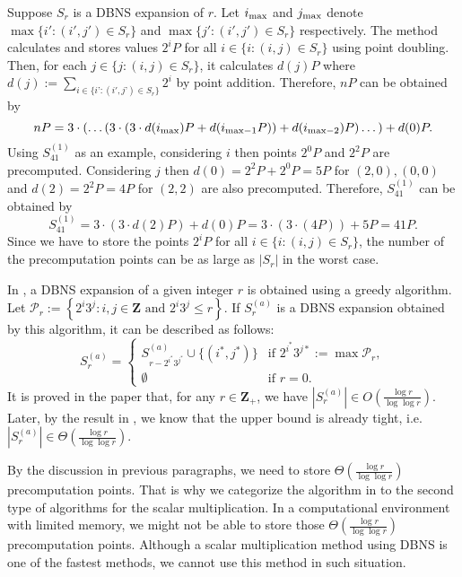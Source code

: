 Suppose $S_r$ is a DBNS expansion of $r$. Let $i_{\rm max}$ and $j_{\rm max}$ denote $\max\{ i' : (i',j') \in S_r \}$ and $\max\{ j' : (i',j') \in S_r \}$ respectively.
The method \cite{MH09} calculates and stores values $2^iP$ for all $i \in \{i : (i, j) \in S_r \}$ using point doubling.
Then, for each $j \in \{j : (i, j) \in S_r \}$, it calculates $d(j)P$ where $d(j) := \sum\limits_{i \in \{i’ : (i',j’) \in S_r\}} 2^i $ by point addition.
Therefore, $nP$ can be obtained by
$$nP = 3\cdot \left( \dots \left( 3 \cdot \left( 3 \cdot d(i_{\rm max})P + d(i_{\mathrm{max} - 1}P) \right) + d(i_{\mathrm{max} - 2})P \right) \dots \right) + d(0)P.$$
Using $S_{41}^{(1)}$ as an example, considering $i$ then points $2^0P$ and $2^2P$ are precomputed.
Considering $j$ then $d(0) = 2^2P + 2^0P = 5P$ for $(2,0),(0,0)$ and $d(2) = 2^2P = 4P$ for $(2,2)$ are also precomputed.
Therefore, $S_{41}^{(1)}$ can be obtained by
$$S_{41}^{(1)} = 3 \cdot \left( 3 \cdot d(2)P  \right) + d(0)P = 3 \cdot \left( 3 \cdot \left( 4P \right)  \right) + 5P = 41P.$$
Since we have to store the points $2^iP$ for all $i \in \{i : (i,j) \in S_r\}$, the number of the precomputation points can be as large as $|S_r|$ in the worst case.

In \cite{dbns2}, a DBNS expansion of a given integer $r$ is obtained using a greedy algorithm.
Let $\mathcal{P}_r := \left\{ 2^i3^j : i,j \in \mathbf{Z} \text{ and } 2^i3^j \leq r \right\}$.
If $S^{(a)}_r$ is a DBNS expansion obtained by this algorithm,
it can be described as follows:
\[
S^{(a)}_r =
\begin{cases}
S^{(a)}_{r - 2^{i^*}3^{j^*}} \cup \{(i^*, j^*)\} & \text{if } 2^{i^*}3^{j*} := \max \mathcal{P}_r, \\
\emptyset       & \text{if } r = 0.
\end{cases}
\]
It is proved in the paper that, for any $r \in \mathbf{Z}_+$, we have $\left|S_r^{(a)}\right| \in O(\frac{\log r}{\log \log r})$.
Later, by the result in \cite{dbns3}, we know that the upper bound is already tight, i.e. $\left|S_r^{(a)}\right| \in \Theta(\frac{\log r}{\log \log r})$.

By the discussion in previous paragraphs, we need to store $\Theta(\frac{\log r}{\log \log r})$ precomputation points.
That is why we categorize the algorithm in \cite{MH09} to the second type of algorithms for the scalar multiplication.
In a computational environment with limited memory, we might not be able to store those $\Theta(\frac{\log r}{\log \log r})$ precomputation points.
Although a scalar multiplication method using DBNS is one of the fastest methods, we cannot use this method in such situation.

